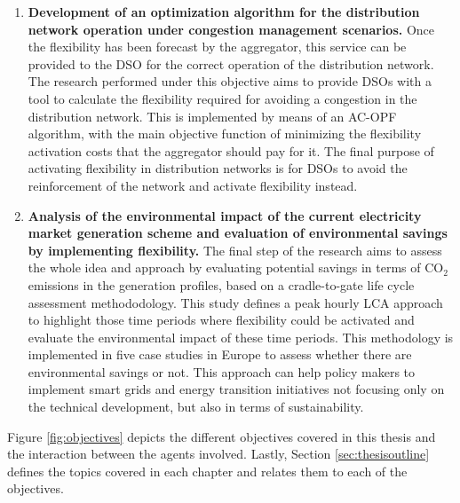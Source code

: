 \begin{enumerate}
\item \textbf{Development of an optimization algorithm for the distribution network operation under congestion management scenarios.} Once the flexibility has been forecast by the aggregator, this service can be provided to the DSO for the correct operation of the distribution network. The research performed under this objective aims to provide DSOs with a tool to calculate the flexibility required for avoiding a congestion in the distribution network. This is implemented by means of an AC-OPF algorithm, with the main objective function of minimizing the flexibility activation costs that the aggregator should pay for it. The final purpose of activating flexibility in distribution networks is for DSOs to avoid the reinforcement of the network and activate flexibility instead. 
\item \textbf{Analysis of the environmental impact of the current electricity market generation scheme and evaluation of environmental savings by implementing flexibility.} The final step of the research aims to assess the whole idea and approach by evaluating potential savings in terms of CO$_2$ emissions in the generation profiles, based on a cradle-to-gate life cycle assessment methododology. This study defines a peak hourly LCA approach to highlight those time periods where flexibility could be activated and evaluate the environmental impact of these time periods. This methodology is implemented in five case studies in Europe to assess whether there are environmental savings or not. This approach can help policy makers to implement smart grids and energy transition initiatives not focusing only on the technical development, but also in terms of sustainability. 
\end{enumerate} 

Figure \ref{fig:objectives} depicts the different objectives covered in this thesis and the interaction between the agents involved. Lastly, Section \ref{sec:thesisoutline} defines the topics covered in each chapter and relates them to each of the objectives. 

